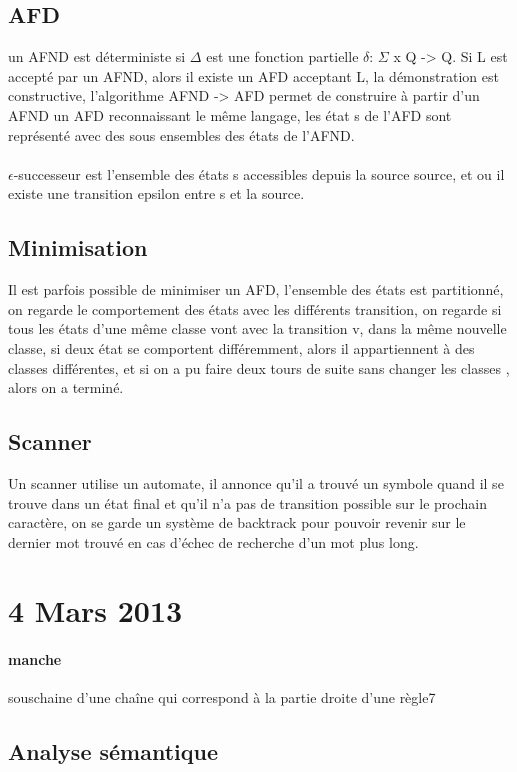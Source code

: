 \documentclass{article}
\begin{document}
\subsection{AFD} un AFND est déterministe si $\Delta$ est une fonction partielle $\delta$: $\Sigma$ x Q -> Q. Si L est accepté par un AFND, alors il existe un AFD acceptant L, la démonstration est constructive, l'algorithme AFND -> AFD permet de construire à partir d'un AFND un AFD reconnaissant le même langage, les état s de l'AFD sont représenté avec des sous ensembles des états de l'AFND.\\\\$\epsilon$-successeur est l'ensemble des états s accessibles depuis la source source, et ou il existe une transition epsilon entre s et la source.
\subsection{Minimisation} Il est parfois possible de minimiser un AFD, l'ensemble des états  est partitionné, on regarde le comportement des états avec les différents transition, on regarde si tous les états d'une même classe vont avec la transition v, dans la même nouvelle classe, si deux état se comportent différemment, alors il appartiennent à des classes différentes, et si on a pu faire deux tours de suite sans changer les classes , alors on a terminé.
\subsection{Scanner} Un scanner utilise un automate, il annonce qu'il a trouvé un symbole quand il se trouve dans un état final et qu'il n'a pas de transition possible sur le prochain caractère, on se garde un système de backtrack pour pouvoir revenir sur le dernier mot trouvé en cas d'échec de recherche d'un mot plus long.


\section{4 Mars 2013}
\paragraph{manche} souschaine d’une chaîne qui correspond à la partie droite d'une règle7

\subsection{Analyse sémantique}
\end{document}
